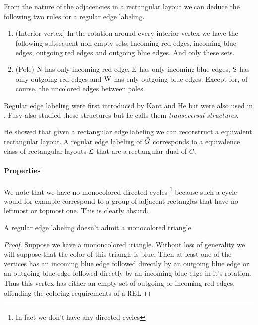  From the nature of the adjacencies in a rectangular layout we can deduce the following two rules for a regular edge labeling.
  \begin{enumerate}
    \item (Interior vertex) In the rotation around every interior vertex we have the following subsequent non-empty sets: Incoming red edges, incoming blue edges, outgoing red edges and outgoing blue edges. And only these sets.
    \item (Pole) $\mathrm{N}$ has only incoming red edge, $\mathrm{E}$ has only incoming blue edges, $\mathrm{S}$ has only outgoing red edges and $\mathrm{W}$ has only outgoing blue edges. Except for, of course, the uncolored edges between poles.
  \end{enumerate}

  Regular edge labeling were first introduced by Kant and He \cite{Kant1997} but were also used in \cite{Eppstein2012}. Fusy also studied these structures \cite{Fusy2006,Fusy2009} but he calls them \emph{transeversal structures}.

  He showed \cite{He} that given a rectangular edge labeling we can reconstruct a equivalent rectangular layout.
  A regular edge labeling  of $\bar{G}$ corresponds to a equivalence class of rectangular layouts $\mathcal{L}$ that are a rectangular dual of $G$. 

  \paragraph{Properties}
  We note that we have no monocolored directed cycles \footnote{In fact we don't have any directed cycles} because such a cycle would for example correspond to a  group of adjacent rectangles that have  no leftmost or topmost one. This is clearly absurd.

  \begin{lemma}
    \label{lm:rel:noMonoColoredTriangles}
    A regular edge labeling doesn't admit a monocolored triangle
  \end{lemma}

  \begin{proof}
    Suppose we have a mononcolored triangle. Without loss of generality we will suppose that the color of this triangle is blue. Then at least one of the vertices has an incoming blue edge followed directly by an outgoing blue edge or an outgoing blue edge followed directly by an incoming blue edge in it's rotation. Thus this vertex has either an empty set of outgoing or incoming red edges, offending the coloring requirements of a REL
  \end{proof}


